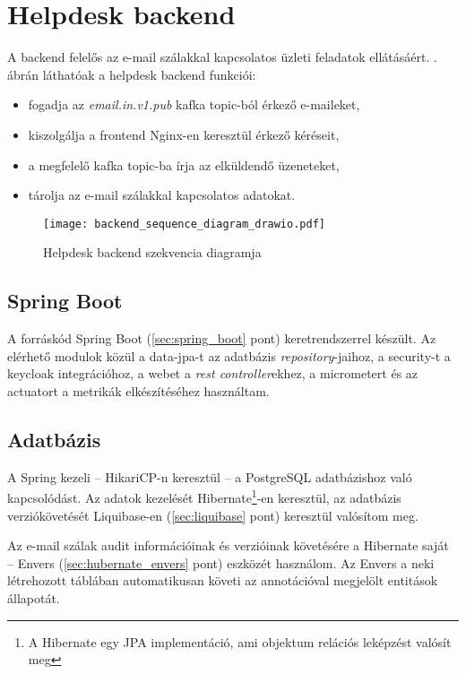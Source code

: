 \section{Helpdesk backend}\label{sec:backend}
A backend felelős az e-mail szálakkal kapcsolatos üzleti feladatok ellátásáért. . ábrán láthatóak a helpdesk backend funkciói:
\begin{itemize}
	\item fogadja az \textit{email.in.v1.pub} kafka topic-ból érkező e-maileket, 
	\item kiszolgálja a frontend Nginx-en keresztül érkező kéréseit,
	\item a megfelelő kafka topic-ba írja az elküldendő üzeneteket,
	\item tárolja az e-mail szálakkal kapcsolatos adatokat.
\end{itemize}


\begin{figure}[hbt] 
	\centering
	\texttt{[image: backend\_sequence\_diagram\_drawio.pdf]}
	\caption{Helpdesk backend szekvencia diagramja}
	\label{fig:backend_sequence_diagram}
\end{figure}


\subsection{Spring Boot}
A forráskód Spring Boot (\ref{sec:spring_boot} pont) keretrendszerrel készült. Az elérhető modulok közül a data-jpa-t az adatbázis \textit{repository}-jaihoz, a security-t a keycloak integrációhoz, a webet a \textit{rest controller}ekhez, a micrometert és az actuatort a metrikák elkészítéséhez használtam.	


\subsection{Adatbázis}\label{sec:adatbazis}
A Spring kezeli --  HikariCP-n keresztül --   a PostgreSQL adatbázishoz való kapcsolódást.
Az adatok kezelését Hibernate\footnote{A Hibernate egy JPA implementáció, ami objektum relációs leképzést valósít meg}-en keresztül, az adatbázis verziókövetését Liquibase-en (\ref{sec:liquibase} pont) keresztül valósítom meg. 

Az e-mail szálak audit információinak és verzióinak követésére a Hibernate saját  --   Envers (\ref{sec:hubernate_envers} pont) eszközét használom. Az Envers a neki létrehozott táblában automatikusan követi az annotációval megjelölt entitások állapotát.

